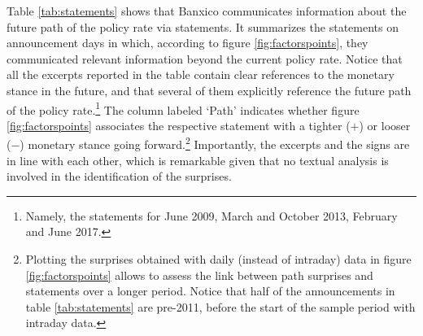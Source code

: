 {Table \ref{tab:statements} shows that Banxico communicates information about the future path of the policy rate via statements. 
It summarizes the statements on announcement days in which, according to figure \ref{fig:factorspoints}, they communicated relevant information beyond the current policy rate. 
Notice that all the excerpts reported in the table contain clear references to the monetary stance in the future, and that several of them explicitly reference the future path of the policy rate.\footnote{Namely, the statements for June 2009, March and October 2013, February and June 2017.} 
The column labeled `Path' indicates whether figure \ref{fig:factorspoints} associates the respective statement with a tighter (\(+\)) or looser (\(-\)) monetary stance going forward.\footnote{Plotting the surprises obtained with daily (instead of intraday) data in figure \ref{fig:factorspoints} allows to assess the link between path surprises and statements over a longer period. Notice that half of the announcements in table \ref{tab:statements} are pre-2011, before the start of the sample period with intraday data.} 
Importantly, the excerpts and the signs are in line with each other, which is remarkable given that no textual analysis is involved in the identification of the surprises. 



}
